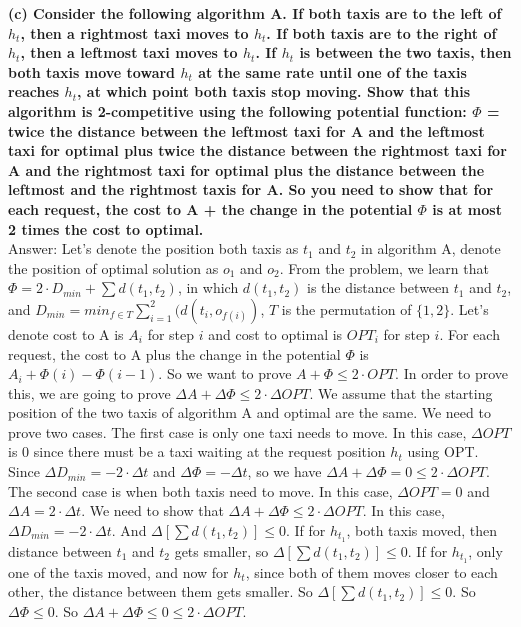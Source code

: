 \documentclass{article}
\begin{document}
\textbf{(c) Consider the following algorithm A. If both taxis are to the left of $h_t$, then a rightmost taxi moves to $h_t$. If both taxis are to the right of $h_t$, then a leftmost taxi moves to $h_t$. If $h_t$ is between the two taxis, then both taxis move toward $h_t$ at the same rate until one of the taxis reaches $h_t$, at which point both taxis stop moving. Show that this algorithm is 2-competitive using the following potential function: $\Phi$ = twice the distance between the leftmost taxi for A and the leftmost taxi for optimal plus twice the distance between the rightmost taxi for A and the rightmost taxi for optimal plus the distance between the leftmost and the rightmost taxis for A. So you need to show that for each request, the cost to A + the change in the potential $\Phi$ is at most 2 times the cost to optimal.
}\\ \newline
Answer: Let's denote the position both taxis as $t_1$ and $t_2$ in algorithm A, denote the position of optimal solution as $o_1$ and $o_2$. From the problem, we learn that $\Phi = 2\cdot D_{min} + \sum d(t_1, t_2)$, in which $d(t_1, t_2)$ is the distance between $t_1$ and $t_2$, and $D_{min} = min_{f\in T}\sum_{i=1}^2(d(t_i, o_{f(i)})$, $T$ is the permutation of $\{1,2\}$. Let's denote cost to A is $A_i$ for step $i$ and cost to optimal is $OPT_i$ for step $i$. For each request, the cost to A plus the change in the potential $\Phi$ is $A_i + \Phi(i) - \Phi(i-1)$. So we want to prove $A + \Phi \leq 2\cdot OPT$. In order to prove this, we are going to prove $\Delta A + \Delta \Phi \leq 2 \cdot \Delta OPT$. We assume that the starting position of the two taxis of algorithm A and optimal are the same. We need to prove two cases. The first case is only one taxi needs to move. In this case, $\Delta OPT$ is 0 since there must be a taxi waiting at the request position $h_t$ using OPT. Since $\Delta D_{min} = -2\cdot \Delta t$ and $\Delta \Phi = -\Delta t$, so we have $\Delta A + \Delta \Phi = 0 \leq 2\cdot \Delta OPT$. The second case is when both taxis need to move.  In this case, $\Delta OPT = 0$ and $\Delta A = 2\cdot \Delta t$. We need to show that $\Delta A + \Delta \Phi \leq 2 \cdot \Delta OPT$. In this case, $\Delta D_{min} = -2 \cdot \Delta t$. And $\Delta [\sum d(t_1, t_2)] \leq 0$. If for $h_{t_1}$, both taxis moved, then distance between $t_1$ and $t_2$ gets smaller, so $\Delta [\sum d(t_1, t_2)] \leq 0$. If for $h_{t_1}$, only one of the taxis moved, and now for $h_t$, since both of them moves closer to each other, the distance between them gets smaller. So $\Delta [\sum d(t_1, t_2)] \leq 0$. So $\Delta \Phi \leq 0$. So $\Delta A + \Delta \Phi \leq 0 \leq 2 \cdot \Delta OPT$.
\end{document}

